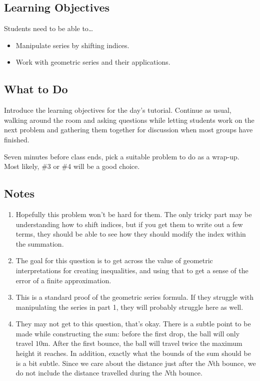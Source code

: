 \subsection*{Learning Objectives}
	Students need to be able to\ldots
	\begin{itemize}
		\item Manipulate series by shifting indices.
        \item Work with geometric series and their applications.
	\end{itemize}

\subsection*{What to Do}
	Introduce the learning objectives for the day's tutorial.
	Continue as usual, walking around the room and asking questions while letting students work on the next problem and gathering them together for discussion when most groups have finished.
    
    Seven minutes before class ends, pick a suitable problem to do as a wrap-up. Most likely, \#3 or \#4 will be a good choice.
	
\subsection*{Notes}
	\begin{enumerate}
		\item Hopefully this problem won't be hard for them. The only tricky part may be understanding how to shift indices, but if you get them to write out a few terms, they should be able to see how they should modify the index within the summation.

		\item The goal for this question is to get across the value of geometric interpretations for creating inequalities, and using that to get a sense of the error of a finite approximation.

		\item This is a standard proof of the geometric series formula. If they struggle with manipulating the series in part 1, they will probably struggle here as well. 

		\item They may not get to this question, that's okay. There is a subtle point to be made while constructing the sum: before the first drop, the ball will only travel $10$m. After the first bounce, the ball will travel twice the maximum height it reaches. In addition, exactly what the bounds of the sum should be is a bit subtle. Since we care about the distance just after the $N$th bounce, we do not include the distance travelled during the $N$th bounce.

	\end{enumerate}